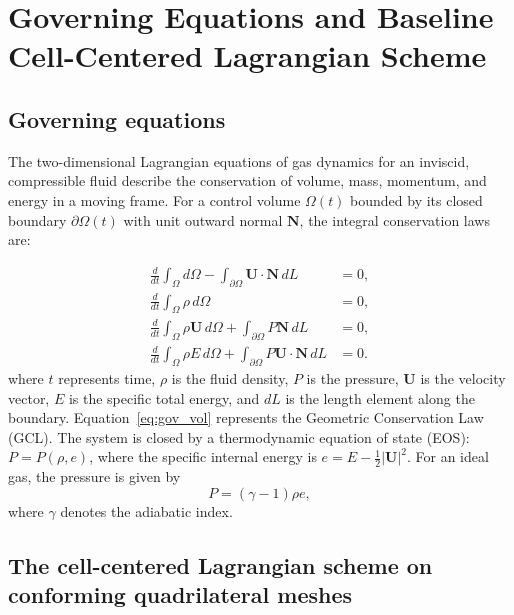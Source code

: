 \documentclass[a4paper]{cas-sc}
\begin{document}
\section{Governing Equations and Baseline Cell-Centered Lagrangian Scheme}
\label{sec:baseline}

\subsection{Governing equations}
\label{sec:governing}

The two-dimensional Lagrangian equations of gas dynamics for an inviscid, compressible fluid describe the conservation of volume, mass, momentum, and energy in a moving frame. For a control volume $\Omega(t)$ bounded by its closed boundary $\partial\Omega(t)$ with unit outward normal $\boldsymbol{N}$, the integral conservation laws are:

\begin{subequations}
	\begin{align}
		\frac{d}{dt} \int_{\Omega} d\Omega - \int_{\partial\Omega} \boldsymbol{U} \cdot \boldsymbol{N} \, dL &= 0, \label{eq:gov_vol}\\
		\frac{d}{dt} \int_{\Omega} \rho \, d\Omega &= 0, \label{eq:gov_mass}\\
		\frac{d}{dt} \int_{\Omega} \rho \boldsymbol{U} \, d\Omega + \int_{\partial\Omega} P \boldsymbol{N} \, dL &= 0, \label{eq:gov_mom}\\
		\frac{d}{dt} \int_{\Omega} \rho E \, d\Omega + \int_{\partial\Omega} P \boldsymbol{U} \cdot \boldsymbol{N} \, dL &= 0. \label{eq:gov_ene}
	\end{align}
	\label{eq:gov_all}
\end{subequations}
where $t$ represents time, $\rho$ is the fluid density, $P$ is the pressure, $\boldsymbol{U}$ is the velocity vector, $E$ is the specific total energy, and $dL$ is the length element along the boundary. Equation~\eqref{eq:gov_vol} represents the Geometric Conservation Law (GCL). The system is closed by a thermodynamic equation of state (EOS): $P = P(\rho, e)$, where the specific internal energy is $e = E - \frac{1}{2}|\boldsymbol{U}|^2$. For an ideal gas, the pressure is given by
\begin{equation}
		P = (\gamma-1)\rho e,
		\label{eq:eos_ideal}
	\end{equation}
	where $\gamma$ denotes the adiabatic index.

\subsection{The cell-centered Lagrangian scheme on conforming quadrilateral meshes}
\label{sec:cch}
\end{document}
